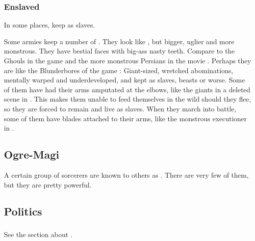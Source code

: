 \subsubsection{Enslaved}
In some places, \humans keep \nephilim{} as slaves. 

Some \human armies keep a number of \nephil {}. 
They look like \humans, but bigger, uglier and more monstrous. 
They have bestial faces with big-ass nasty teeth. 
Compare to the Ghouls in the game \cite{VideoGame:WarcraftIII} and the more monstrous Persians in the movie \cite{Movie:300}. 
Perhaps they are like the Blunderbores of the game \cite{VideoGame:DiabloII}: 
Giant-sized, wretched abominations, mentally warped and underdeveloped, and kept as slaves, beasts or worse. 
Some of them have had their arms amputated at the elbows, like the giants in a deleted scene in \cite{Movie:300}. This makes them unable to feed themselves in the wild should they flee, so they are forced to remain and live as slaves. 
When they march into battle, some of them have blades attached to their arms, like the monstrous executioner in \cite{Movie:300}.








\subsection{Ogre-Magi}
A certain group of \nephilic{} sorcerers are known to others as . There are very few of them, but they are pretty powerful.









\subsection{Politics}





\subsubsection{\Aryothim}
See the section about . 









